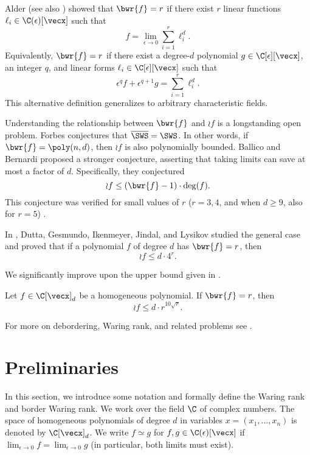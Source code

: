 \documentclass{article}
\begin{document}
Alder \cite{Alder84} (see also \cite[Appendix 20.6]{BCS-book97}) showed that $\bwr{f}=r$ if there exist $r$ linear functions $\ell_i \in \C(\epsilon)[\vecx]$ such that 
\[f=\lim_{\epsilon\to 0}\sum_{i=1}^{r}\ell_i^d.
\]
Equivalently, $\bwr{f}=r$ if there exist a degree-$d$ polynomial $g\in \C[\epsilon][\vecx]$, an integer $q$, and linear forms $\ell_i \in \C[\epsilon][\vecx]$ such that 
\[\epsilon^q f + \epsilon^{q+1}g=\sum_{i=1}^{r}\ell_i^d.
\]
This alternative definition generalizes to arbitrary characteristic fields.





Understanding the relationship between $\bwr{f}$ and $\wr{f}$ is a longstanding open problem. Forbes \cite{Forbes-talk} conjectures that $\overline{\SWS}=\SWS$. In other words, if $\bwr{f}=\poly(n,d)$, then $\wr{f}$ is also polynomially bounded. Ballico and Bernardi \cite{BallicoBernardi17} proposed a stronger conjecture, asserting that taking limits can save at most a factor of $d$.  Specifically, they conjectured
\[
\wr{f} \leq (\bwr{f} - 1) \cdot \deg(f).
\]   
This conjecture was verified for small values of $r$ ($r=3,4$, and when $d\geq 9$, also for $r=5$) \cite{LandsbergTeitler10,BallicoBernardi13,Ballico18}.



In \cite{DuttaGIJL24}, Dutta, Gesmundo, Ikenmeyer, Jindal, and Lysikov studied the general case and proved that if a polynomial $f$ of degree $d$ has $\bwr{f} = r$, then  
\[
\wr{f} \leq d \cdot 4^r.
\]  

We significantly improve upon the upper bound given in \cite{DuttaGIJL24}.  

\begin{theorem}\label{thm:main}  
Let $f \in \C[\vecx]_d$ be a homogeneous polynomial. If $\bwr{f} = r$, then  
\[
\wr{f} \leq d \cdot r^{10 \sqrt{r}}.
\]  
\end{theorem}

For more on debordering,  Waring rank, and related problems see \cite{bernardi2018hitchhiker,DuttaDwivediSaxena-demystifying21,DuttaGIJL24}.

\section{Preliminaries}


In this section, we introduce some notation and formally define the Waring rank and border Waring rank. We work over the field $\C$ of complex numbers. The space of homogeneous polynomials of degree $d$ in variables $x = (x_1,\ldots, x_n)$ is denoted by $\C[\vecx]_d$. We write $f \simeq g$ for $f, g \in \C(\epsilon)[\vecx]$ if $\lim_{\epsilon\to 0} f = \lim_{\epsilon\to 0} g$ (in particular, both limits must exist).
\end{document}
